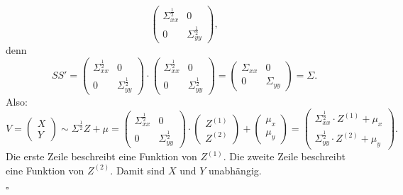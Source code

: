 \documentclass[10pt]{article}
\newcommand{\halb}{\frac{1}{2}} %
\newenvironment{BWS}[1][]
{\begin{Beweis}[frametitle=#1]}{\end{Beweis}}
\begin{document}
\begin{BWS}[Beweis 4.0.3 (Unabhängigkeit)]
\begin{equation*}
\begin{pmatrix}
					\Sigma_{xx}^{\halb} & 0 \\ 0 & \Sigma_{yy}^{\halb}
					\end{pmatrix},
				\end{equation*}
				denn 
				\begin{equation*}
					SS' = \begin{pmatrix}
						\Sigma_{xx}^{\halb} & 0 \\ 0 & \Sigma_{yy}^{\halb}
					\end{pmatrix} \cdot \begin{pmatrix}
					\Sigma_{xx}^{\halb} & 0 \\ 0 & \Sigma_{yy}^{\halb}
					\end{pmatrix} = \begin{pmatrix}
					\Sigma_{xx} & 0 \\ 0 & \Sigma_{yy}
					\end{pmatrix} = \Sigma.
				\end{equation*}
				Also:
				\begin{equation*}
					V =  \left(
					\begin{array}{c}
						X\\
						Y
					\end{array}
					\right) \sim \Sigma^{\halb} Z + \mu = \begin{pmatrix}
						\Sigma_{xx}^{\halb} & 0 \\ 0 & \Sigma_{yy}^{\halb}
					\end{pmatrix} \cdot \left(
					\begin{array}{c}
					Z^{(1)}\\
					Z^{(2)}
					\end{array}
					\right) + \left(
					\begin{array}{c}
						\mu_x\\
						\mu_y
					\end{array}
					\right) =
					\left(
					\begin{array}{c}
						\Sigma_{xx}^{\halb} \cdot Z^{(1)} + \mu_x\\
						\Sigma_{yy}^{\halb} \cdot Z^{(2)} + \mu_y
					\end{array}
					\right).
				\end{equation*}
				Die erste Zeile beschreibt eine Funktion von $Z^{(1)}$. Die zweite Zeile beschreibt eine Funktion von  $Z^{(2)}$. Damit sind $X$ und $Y$ unabhängig.
				\begin{flushright}
					$\square$
				\end{flushright}
			\end{BWS}
\end{document}
